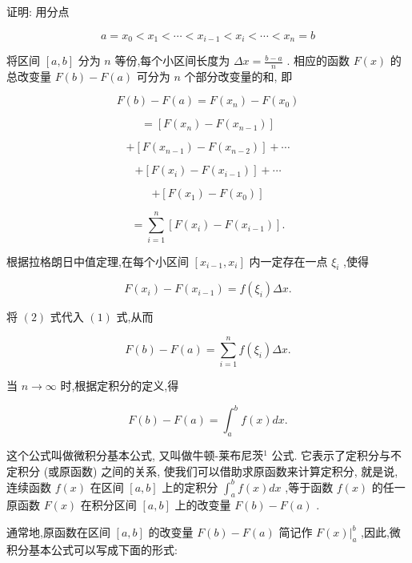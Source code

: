 \documentclass[lang=cn,newtx,10pt,scheme=chinese]{elegantbook}
\begin{document}
证明: 用分点

\[
a = {x}_{0} < {x}_{1} < \cdots < {x}_{i - 1} < {x}_{i} < \cdots < {x}_{n} = b
\]

将区间 \(\left\lbrack {a,b}\right\rbrack\) 分为 \(n\) 等份,每个小区间长度为 \({\Delta x} = \frac{b - a}{n}\) . 相应的函数 \(F\left( x\right)\) 的总改变量 \(F\left( b\right) - F\left( a\right)\) 可分为 \(n\) 个部分改变量的和, 即

\[
F\left( b\right) - F\left( a\right) = F\left( {x}_{n}\right) - F\left( {x}_{0}\right)
\]

\[
= \left\lbrack {F\left( {x}_{n}\right) - F\left( {x}_{n - 1}\right) }\right\rbrack
\]

\[
+ \left\lbrack {F\left( {x}_{n - 1}\right) - F\left( {x}_{n - 2}\right) }\right\rbrack + \cdots
\]

\[
+ \left\lbrack {F\left( {x}_{i}\right) - F\left( {x}_{i - 1}\right) }\right\rbrack + \cdots
\]

\[
+ \left\lbrack {F\left( {x}_{1}\right) - F\left( {x}_{0}\right) }\right\rbrack
\]

\[
= \mathop{\sum }\limits_{{i = 1}}^{n}\left\lbrack {F\left( {x}_{i}\right) - F\left( {x}_{i - 1}\right) }\right\rbrack \text{.} \tag{1}
\]

根据拉格朗日中值定理,在每个小区间 \(\left\lbrack {{x}_{i - 1},{x}_{i}}\right\rbrack\) 内一定存在一点 \({\xi }_{i}\) ,使得

\[
F\left( {x}_{i}\right) - F\left( {x}_{i - 1}\right) = f\left( {\xi }_{i}\right) {\Delta x}. \tag{2}
\]

将 \(\left( 2\right)\) 式代入 \(\left( 1\right)\) 式,从而

\[
F\left( b\right) - F\left( a\right) = \mathop{\sum }\limits_{{i = 1}}^{n}f\left( {\xi }_{i}\right) {\Delta x}.
\]

当 \(n \rightarrow \infty\) 时,根据定积分的定义,得

\[
F\left( b\right) - F\left( a\right) = {\int }_{a}^{b}f\left( x\right) {dx}.
\]

这个公式叫做微积分基本公式, 又叫做牛顿-莱布尼茨${ }^{1}$ 公式. 它表示了定积分与不定积分 (或原函数) 之间的关系, 使我们可以借助求原函数来计算定积分, 就是说, 连续函数 \(f\left( x\right)\) 在区间 \(\left\lbrack {a,b}\right\rbrack\) 上的定积分 \({\int }_{a}^{b}f\left( x\right) {dx}\) ,等于函数 \(f\left( x\right)\) 的任一原函数 \(F\left( x\right)\) 在积分区间 \(\left\lbrack {a,b}\right\rbrack\) 上的改变量 \(F\left( b\right) - F\left( a\right)\) .

通常地,原函数在区间 \(\left\lbrack {a,b}\right\rbrack\) 的改变量 \(F\left( b\right) - F\left( a\right)\) 简记作 \({\left. F\left( x\right) \right| }_{a}^{b}\) ,因此,微积分基本公式可以写成下面的形式:
\end{document}
